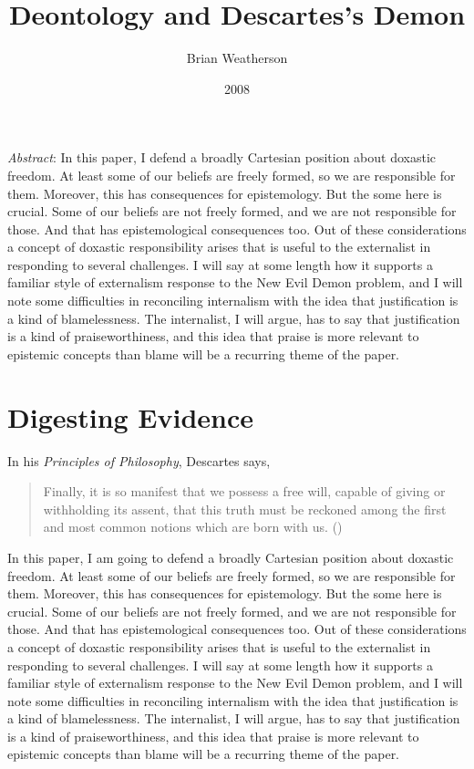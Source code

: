 \documentclass[
  11pt,
  letterpaper,
  DIV=11,
  numbers=noendperiod,
  twoside]{scrartcl}
\title{Deontology and Descartes's Demon}
\author{Brian Weatherson}
\date{2008}
\renewenvironment{abstract}
 {\vspace{-1.25cm}
 \quotation\small\noindent\emph{Abstract}:}
 {\endquotation}
\begin{document}
\maketitle
\begin{abstract}
In this paper, I defend a broadly Cartesian position about doxastic
freedom. At least some of our beliefs are freely formed, so we are
responsible for them. Moreover, this has consequences for epistemology.
But the some here is crucial. Some of our beliefs are not freely formed,
and we are not responsible for those. And that has epistemological
consequences too. Out of these considerations a concept of doxastic
responsibility arises that is useful to the externalist in responding to
several challenges. I will say at some length how it supports a familiar
style of externalism response to the New Evil Demon problem, and I will
note some difficulties in reconciling internalism with the idea that
justification is a kind of blamelessness. The internalist, I will argue,
has to say that justification is a kind of praiseworthiness, and this
idea that praise is more relevant to epistemic concepts than blame will
be a recurring theme of the paper.
\end{abstract}


\section{Digesting Evidence}\label{digesting-evidence}

In his \emph{Principles of Philosophy}, Descartes says,

\begin{quote}
Finally, it is so manifest that we possess a free will, capable of
giving or withholding its assent, that this truth must be reckoned among
the first and most common notions which are born with us.
()
\end{quote}

In this paper, I am going to defend a broadly Cartesian position about
doxastic freedom. At least some of our beliefs are freely formed, so we
are responsible for them. Moreover, this has consequences for
epistemology. But the some here is crucial. Some of our beliefs are not
freely formed, and we are not responsible for those. And that has
epistemological consequences too. Out of these considerations a concept
of doxastic responsibility arises that is useful to the externalist in
responding to several challenges. I will say at some length how it
supports a familiar style of externalism response to the New Evil Demon
problem, and I will note some difficulties in reconciling internalism
with the idea that justification is a kind of blamelessness. The
internalist, I will argue, has to say that justification is a kind of
praiseworthiness, and this idea that praise is more relevant to
epistemic concepts than blame will be a recurring theme of the paper.
\end{document}
